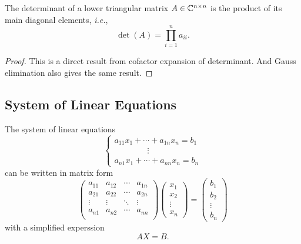 \begin{theorem}\label{lowertriangle}
The determinant of a lower triangular matrix \(A\in\mathbb{C}^{n\times n}\) is the product of its main diagonal elements, \textit{i.e.},
\[ \det(A)=\prod_{i=1}^n a_{ii}. \]
\end{theorem}
\begin{proof}
This is a direct result from cofactor expansion of determinant.
And Gauss elimination also gives the same result.
\end{proof}


\subsection{System of Linear Equations}
The system of linear equations
\begin{equation}
\begin{cases}
a_{11}x_1+\cdots+a_{1n}x_n=b_1\\
\qquad\qquad\vdots \\
a_{n1}x_1+\cdots+a_{nn}x_n=b_n
\end{cases}
\end{equation}
can be written in matrix form
\begin{equation}
\begin{pmatrix}
a_{11} & a_{12} & \cdots & a_{1n} \\
a_{21} & a_{22} & \cdots & a_{2n} \\
\vdots & \vdots & \ddots & \vdots \\
a_{n1} & a_{n2} & \cdots & a_{nn} \\
\end{pmatrix}
\begin{pmatrix}
x_1 \\ x_2 \\ \vdots \\ x_n
\end{pmatrix}
=
\begin{pmatrix}
b_1 \\ b_2 \\ \vdots \\ b_n
\end{pmatrix}
\end{equation}
with a simplified experssion
\[ AX=B. \]


